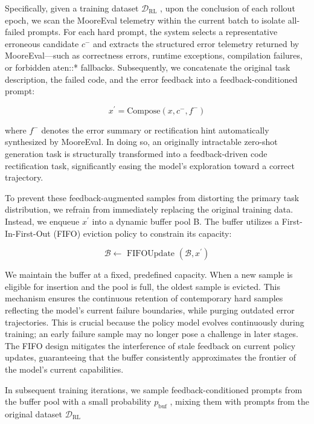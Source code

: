 \documentclass[
  10
]{article}
\begin{document}
Specifically, given a training dataset
\(\mathcal { D } _ { \mathrm { R L } }\) , upon the conclusion of each
rollout epoch, we scan the MooreEval telemetry within the current batch
to isolate all-failed prompts. For each hard prompt, the system selects
a representative erroneous candidate \(c ^ { - }\) and extracts the
structured error telemetry returned by MooreEval---such as correctness
errors, runtime exceptions, compilation failures, or forbidden aten::*
fallbacks. Subsequently, we concatenate the original task description,
the failed code, and the error feedback into a feedback-conditioned
prompt:

\[
x ^ {\prime} = \mathrm{Compose} (x, c ^ {-}, f ^ {-})\tag{14}
\]

where \(f ^ { - }\) denotes the error summary or rectification hint
automatically synthesized by MooreEval. In doing so, an originally
intractable zero-shot generation task is structurally transformed into a
feedback-driven code rectification task, significantly easing the
model's exploration toward a correct trajectory.

To prevent these feedback-augmented samples from distorting the primary
task distribution, we refrain from immediately replacing the original
training data. Instead, we enqueue \(x ^ { \prime }\) into a dynamic
buffer pool B. The buffer utilizes a First-In-First-Out (FIFO) eviction
policy to constrain its capacity:

\[
\mathcal {B} \leftarrow \text { FIFOUpdate } (\mathcal {B}, x ^ {\prime})\tag{15}
\]

We maintain the buffer at a fixed, predefined capacity. When a new
sample is eligible for insertion and the pool is full, the oldest sample
is evicted. This mechanism ensures the continuous retention of
contemporary hard samples reflecting the model's current failure
boundaries, while purging outdated error trajectories. This is crucial
because the policy model evolves continuously during training; an early
failure sample may no longer pose a challenge in later stages. The FIFO
design mitigates the interference of stale feedback on current policy
updates, guaranteeing that the buffer consistently approximates the
frontier of the model's current capabilities.

In subsequent training iterations, we sample feedback-conditioned
prompts from the buffer pool with a small probability
\(p _ { \mathrm { b u f } }\) , mixing them with prompts from the
original dataset \(\mathcal { D } _ { \mathrm { R L } }\)
\end{document}
